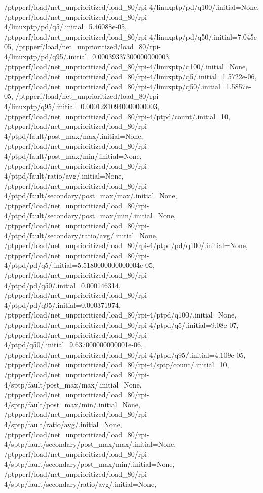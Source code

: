 {    /ptpperf/load/net_unprioritized/load_80/rpi-4/linuxptp/pd/q100/.initial=None,
    /ptpperf/load/net_unprioritized/load_80/rpi-4/linuxptp/pd/q5/.initial=5.46088e-05,
    /ptpperf/load/net_unprioritized/load_80/rpi-4/linuxptp/pd/q50/.initial=7.045e-05,
    /ptpperf/load/net_unprioritized/load_80/rpi-4/linuxptp/pd/q95/.initial=0.00039337300000000003,
    /ptpperf/load/net_unprioritized/load_80/rpi-4/linuxptp/q100/.initial=None,
    /ptpperf/load/net_unprioritized/load_80/rpi-4/linuxptp/q5/.initial=1.5722e-06,
    /ptpperf/load/net_unprioritized/load_80/rpi-4/linuxptp/q50/.initial=1.5857e-05,
    /ptpperf/load/net_unprioritized/load_80/rpi-4/linuxptp/q95/.initial=0.00012810940000000003,
    /ptpperf/load/net_unprioritized/load_80/rpi-4/ptpd/count/.initial=10,
    /ptpperf/load/net_unprioritized/load_80/rpi-4/ptpd/fault/post_max/max/.initial=None,
    /ptpperf/load/net_unprioritized/load_80/rpi-4/ptpd/fault/post_max/min/.initial=None,
    /ptpperf/load/net_unprioritized/load_80/rpi-4/ptpd/fault/ratio/avg/.initial=None,
    /ptpperf/load/net_unprioritized/load_80/rpi-4/ptpd/fault/secondary/post_max/max/.initial=None,
    /ptpperf/load/net_unprioritized/load_80/rpi-4/ptpd/fault/secondary/post_max/min/.initial=None,
    /ptpperf/load/net_unprioritized/load_80/rpi-4/ptpd/fault/secondary/ratio/avg/.initial=None,
    /ptpperf/load/net_unprioritized/load_80/rpi-4/ptpd/pd/q100/.initial=None,
    /ptpperf/load/net_unprioritized/load_80/rpi-4/ptpd/pd/q5/.initial=5.5180000000000004e-05,
    /ptpperf/load/net_unprioritized/load_80/rpi-4/ptpd/pd/q50/.initial=0.000146314,
    /ptpperf/load/net_unprioritized/load_80/rpi-4/ptpd/pd/q95/.initial=0.000371974,
    /ptpperf/load/net_unprioritized/load_80/rpi-4/ptpd/q100/.initial=None,
    /ptpperf/load/net_unprioritized/load_80/rpi-4/ptpd/q5/.initial=9.08e-07,
    /ptpperf/load/net_unprioritized/load_80/rpi-4/ptpd/q50/.initial=9.637000000000001e-06,
    /ptpperf/load/net_unprioritized/load_80/rpi-4/ptpd/q95/.initial=4.109e-05,
    /ptpperf/load/net_unprioritized/load_80/rpi-4/sptp/count/.initial=10,
    /ptpperf/load/net_unprioritized/load_80/rpi-4/sptp/fault/post_max/max/.initial=None,
    /ptpperf/load/net_unprioritized/load_80/rpi-4/sptp/fault/post_max/min/.initial=None,
    /ptpperf/load/net_unprioritized/load_80/rpi-4/sptp/fault/ratio/avg/.initial=None,
    /ptpperf/load/net_unprioritized/load_80/rpi-4/sptp/fault/secondary/post_max/max/.initial=None,
    /ptpperf/load/net_unprioritized/load_80/rpi-4/sptp/fault/secondary/post_max/min/.initial=None,
    /ptpperf/load/net_unprioritized/load_80/rpi-4/sptp/fault/secondary/ratio/avg/.initial=None,
}
